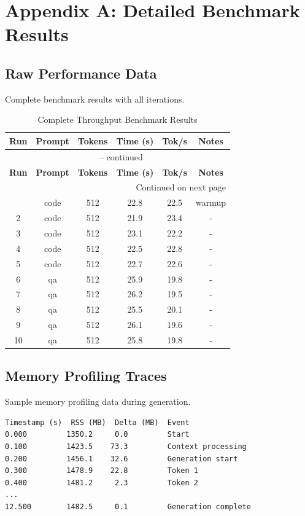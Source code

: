 \section{Appendix A: Detailed Benchmark Results}
\label{appendix:benchmarks}

\subsection{Raw Performance Data}

Complete benchmark results with all iterations.

\begin{longtable}{cccccc}
\caption{Complete Throughput Benchmark Results} \\
\toprule
\textbf{Run} & \textbf{Prompt} & \textbf{Tokens} & \textbf{Time (s)} & \textbf{Tok/s} & \textbf{Notes} \\
\midrule
\endfirsthead
\multicolumn{6}{c}{\tablename\ \thetable{} -- continued} \\
\toprule
\textbf{Run} & \textbf{Prompt} & \textbf{Tokens} & \textbf{Time (s)} & \textbf{Tok/s} & \textbf{Notes} \\
\midrule
\endhead
\midrule
\multicolumn{6}{r}{Continued on next page} \\
\endfoot
\bottomrule
\endlastfoot
1 & code & 512 & 22.8 & 22.5 & warmup \\
2 & code & 512 & 21.9 & 23.4 & - \\
3 & code & 512 & 23.1 & 22.2 & - \\
4 & code & 512 & 22.5 & 22.8 & - \\
5 & code & 512 & 22.7 & 22.6 & - \\
6 & qa & 512 & 25.9 & 19.8 & - \\
7 & qa & 512 & 26.2 & 19.5 & - \\
8 & qa & 512 & 25.5 & 20.1 & - \\
9 & qa & 512 & 26.1 & 19.6 & - \\
10 & qa & 512 & 25.8 & 19.8 & - \\
\end{longtable}

\subsection{Memory Profiling Traces}

Sample memory profiling data during generation.

\begin{verbatim}
Timestamp (s)  RSS (MB)  Delta (MB)  Event
0.000         1350.2     0.0         Start
0.100         1423.5    73.3         Context processing
0.200         1456.1    32.6         Generation start
0.300         1478.9    22.8         Token 1
0.400         1481.2     2.3         Token 2
...
12.500        1482.5     0.1         Generation complete
\end{verbatim}

